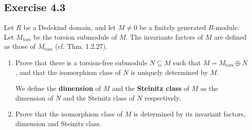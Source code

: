 \documentclass[12pt, a4paper]{article}
\begin{document}
\subsection*{Exercise 4.3}
Let $R$ be a Dedekind domain, and let $M \neq 0$ be a finitely generated $R$-module. Let $M_{\mathrm{tors}}$ be the torsion submodule of $M$. The invariants factors of $M$ are defined as those of $M_{\mathrm{tors}}$ (cf. Thm. 1.2.27).
\begin{enumerate}
    \item Prove that there is a torsion-free submodule $N \subseteq M$ such that $M = M_{\mathrm{tors}} \oplus N$, and that the isomorphism class of $N$ is uniquely determined by $M$.
    
    We define the \textbf{dimension} of $M$ and the \textbf{Steinitz class} of $M$ as the dimension of $N$ and the Steinitz class of $N$ respectively.
    
    \item Prove that the isomorphism class of $M$ is determined by its invariant factors, dimension and Steinitz class.
\end{enumerate}
\end{document}
